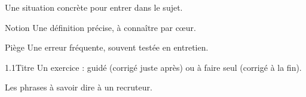 \begin{imagine}
Une situation concrète pour entrer dans le sujet.
\end{imagine}
\vspace{-4pt}
\begin{definition}{Notion}
Une définition précise, à connaître par cœur.
\end{definition}
\vspace{-4pt}
\begin{piege}{Piège}
Une erreur fréquente, souvent testée en entretien.
\end{piege}
\vspace{-4pt}
\begin{exercice}{1.1}{Titre}
Un exercice : guidé (corrigé juste après) ou à faire seul (corrigé à la fin).
\end{exercice}
\vspace{-4pt}
\begin{entretien}
Les phrases à savoir dire à un recruteur.
\end{entretien}

\clearpage
\tableofcontents
\clearpage
\renewcommand{\nomchapitre}{Partie}
